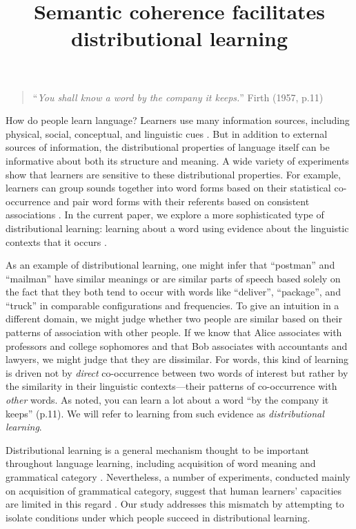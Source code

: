 \documentclass[man,floatsintext]{apa6}
\title{Semantic coherence facilitates distributional learning}
\begin{document}
\maketitle

\begin{quote}
``\emph{You shall know a word by the company it keeps.}'' Firth (1957, p.11)
\end{quote}

How do people learn language? Learners use many information sources, including physical, social, conceptual, and linguistic cues \citep{clark1988, markman1991, gleitman1990, baldwin1993, hollich2000}. But in addition to external sources of information, the distributional properties of language itself can be informative about both its structure and meaning. A wide variety of experiments show that learners are sensitive to these distributional properties. For example, learners can group sounds together into word forms based on their statistical co-occurrence \citep{saffran1996a, saffran1996b} and pair word forms with their referents based on consistent associations \citep{yu2007,smith2008}. In the current paper, we explore a more sophisticated type of distributional learning: learning about a word using evidence about the linguistic contexts that it occurs \citep{smith1966, maratsos1980, braine1987, redington1998}.

As an example of distributional learning, one might infer that ``postman'' and ``mailman'' have similar meanings or are similar parts of speech based solely on the fact that they both tend to occur with words like ``deliver'', ``package'', and ``truck'' in comparable configurations and frequencies. To give an intuition in a different domain, we might judge whether two people are similar based on their patterns of association with other people. If we know that Alice associates with professors and college sophomores and that Bob associates with accountants and lawyers, we might judge that they are dissimilar. For words, this kind of learning is driven not by \emph{direct} co-occurrence between two words of interest but rather by the similarity in their linguistic contexts---their patterns of co-occurrence with \emph{other} words. As \citet{firth1957} noted, you can learn a lot about a word ``by the company it keeps'' (p.11). We will refer to learning from such evidence as \emph{distributional learning}.

Distributional learning is a general mechanism thought to be important throughout language learning, including acquisition of word meaning \citep{landauer1997} and grammatical category \citep{redington1998}. Nevertheless, a number of experiments, conducted mainly on acquisition of grammatical category, suggest that human learners' capacities are limited in this regard \citep{braine1987, brooks1993, frigo1998, kempe2001, gerken2005, frank2011}. Our study addresses this mismatch by attempting to isolate conditions under which people succeed in distributional learning.
\end{document}
